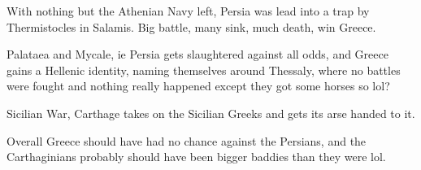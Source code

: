 \documentclass[a4paper, 12pt]{article}
\begin{document}
With nothing but the Athenian Navy left, Persia was lead into a trap
by Thermistocles in Salamis. Big battle, many sink, much death, win Greece.

\par\vspace{1em}

Palataea and Mycale, ie Persia gets slaughtered against all odds, and
Greece gains a Hellenic identity, naming themselves around Thessaly, where
no battles were fought and nothing really happened except they got some horses
so lol?

\par\vspace{1em}

Sicilian War, Carthage takes on the Sicilian Greeks and gets its arse handed to
it.

\par\vspace{1em}

Overall Greece should have had no chance against the Persians, and the
Carthaginians probably should have been bigger baddies than they were lol.

\nocite{*}
\newpage
\printbibliography
\end{document}
